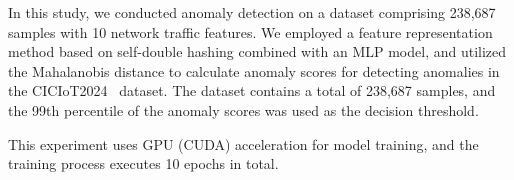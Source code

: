 \begin{ZhChapter}
    In this study, we conducted anomaly detection on a dataset comprising 238,687 samples with 10 network traffic features. We employed a feature representation method based on self-double hashing combined with an MLP model, and utilized the Mahalanobis distance to calculate anomaly scores for detecting anomalies in the CICIoT2024~\cite{ciciot2024} dataset. The dataset contains a total of 238,687 samples, and the 99th percentile of the anomaly scores was used as the decision threshold.


    This experiment uses GPU (CUDA) acceleration for model training, and the training process executes 10 epochs in total.
\end{ZhChapter}